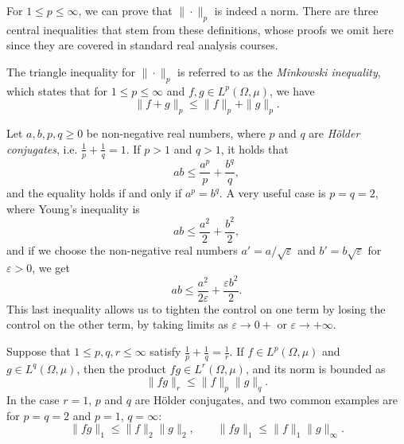 For $1\leq p\leq \infty$, we can prove that $\|\cdot\|_p$ is indeed a norm. There are three central inequalities that stem from these definitions, whose proofs we omit here since they are covered in standard real analysis courses. 
\begin{theorem}
    The triangle inequality for $\|\cdot\|_p$ is referred to as the \emph{Minkowski inequality}, which states that for $1\leq p\leq \infty$ and $f,g\in L^p(\Omega,\mu)$, we have
    \begin{equation}
        \|f+g\|_p \leq \|f\|_p + \|g\|_p.
    \end{equation}
\end{theorem}
\begin{theorem}
    Let $a,b,p,q\geq 0$ be non-negative real numbers, where $p$ and $q$ are \emph{Hölder conjugates}, i.e. $\frac{1}{p}+\frac{1}{q}=1$. If $p>1$ and $q>1$, it holds that 
    \begin{equation}
        ab\leq \frac{a^p}{p} + \frac{b^q}{q},
    \end{equation}
    and the equality holds if and only if $a^p=b^q$. A very useful case is $p=q=2$, where Young's inequality is 
    \begin{equation}
        ab\leq \frac{a^2}{2}+\frac{b^2}{2},
    \end{equation}
    and if we choose the non-negative real numbers $a'=a/\sqrt{\varepsilon}$ and $b'=b\sqrt{\varepsilon}$ for $\varepsilon>0$, we get
    \begin{equation}
        ab\leq \frac{a^2}{2\varepsilon} + \frac{\varepsilon b^2}{2}.
    \end{equation}
    This last inequality allows us to tighten the control on one term by losing the control on the other term, by taking limits as $\varepsilon\to 0+$ or $\varepsilon\to+\infty$. 
\end{theorem}
\begin{theorem}
    Suppose that $1\leq p,q,r\leq \infty$ satisfy $\frac{1}{p}+\frac{1}{q}=\frac{1}{r}$. If $f\in L^p(\Omega,\mu)$ and $g\in L^q(\Omega,\mu)$, then the product $fg\in L^r(\Omega,\mu)$, and its norm is bounded as 
    \begin{equation}
        \|fg\|_r \leq \|f\|_p\|g\|_q.
    \end{equation}
    In the case $r=1$, $p$ and $q$ are Hölder conjugates, and two common examples are for $p=q=2$ and $p=1$, $q=\infty$:
    \begin{equation*}
        \|fg\|_1 \leq \|f\|_2\|g\|_2,\qquad \|fg\|_1 \leq \|f\|_1\|g\|_\infty.
    \end{equation*}
\end{theorem}

